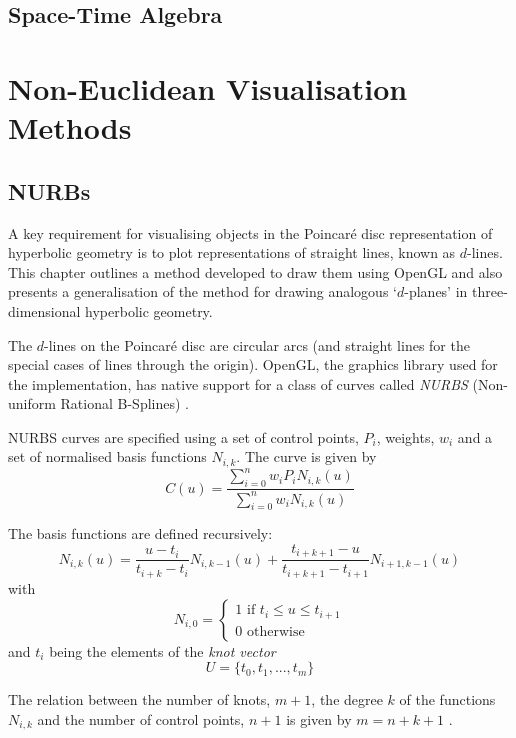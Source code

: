 \subsection{Space-Time Algebra}
\section{Non-Euclidean Visualisation Methods}
\subsection{NURBs}

A key requirement for visualising objects in the Poincar\'e disc
representation of hyperbolic geometry is to plot representations of
straight lines, known as $d$-lines. This chapter outlines a method 
developed to draw them using OpenGL and also presents a generalisation
of the method for drawing analogous `$d$-planes' in three-dimensional
hyperbolic geometry.


The $d$-lines on the Poincar\'e disc are circular arcs (and straight lines
for the special cases of lines through the origin). OpenGL, the graphics
library used for the implementation, has native support for a class
of curves called \emph{NURBS} (Non-uniform Rational B-Splines) 
\cite{mecg}. 


NURBS curves are specified using a set of control points, $P_i$,
weights, $w_i$ and a set of normalised basis functions $N_{i,k}$.
The curve is given by
\[
C(u) = \frac{\sum_{i=0}^n w_i P_i N_{i,k}(u)}{\sum_{i=0}^n w_i N_{i,k}(u)}
\]

The basis functions are defined recursively:
\[
N_{i,k}(u) = \frac{u - t_i}{t_{i+k} - t_i} N_{i,k-1}(u) +
  \frac{t_{i+k+1} - u}{t_{i+k+1} - t_{i+1}} N_{i+1,k-1}(u)
\]
with
\[
N_{i,0} = 
\begin{cases}
1 \mbox{ if } t_i \le u \le t_{i+1} \\ 
0 \mbox{ otherwise} 
\end{cases}
\]
and $t_i$ being the elements of the \emph{knot vector}
\[
U = \{ t_0, t_1, ... , t_m \}
\]

The relation between the number of knots, $m+1$, the degree $k$ of 
the functions $N_{i,k}$ and the number of control points, $n+1$
is given by $m = n + k + 1$ \cite{peigl, rogers}.

